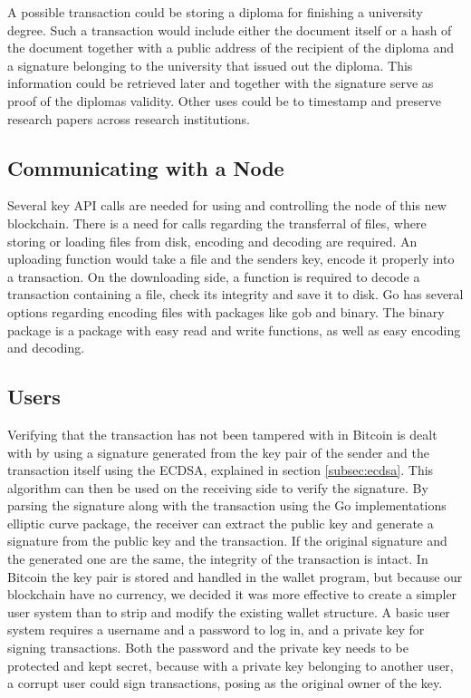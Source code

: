 \documentclass[12pt]{article}
\begin{document}

A possible transaction could be storing a diploma for finishing a university degree. Such a transaction would include either the document itself or a hash of the document together with a public address of the recipient of the diploma and a signature belonging to the university that issued out the diploma. This information could be retrieved later and together with the signature serve as proof of the diplomas validity. Other uses could be to timestamp and preserve research papers across research institutions. 

\subsection{Communicating with a Node}
 
Several key API calls are needed for using and controlling the node of this new blockchain. There is a need for calls regarding the transferral of files, where storing or loading files from disk, encoding and decoding are required. An uploading function would take a file and the senders key, encode it properly into a transaction. On the downloading side, a function is required to decode a transaction containing a file, check its integrity and save it to disk. Go has several options regarding encoding files with  packages like gob and binary. The binary package is a package with easy read and write functions, as well as easy encoding and decoding. %

\subsection{Users}

Verifying that the transaction has not been tampered with in Bitcoin is dealt with by using a signature generated from the key pair of the sender and the transaction itself using the ECDSA, explained in section \ref{subsec:ecdsa}. This algorithm can then be used on the receiving side to verify the signature. By parsing the signature along with the transaction using the Go implementations elliptic curve package, the receiver can extract the public key and generate a signature from the public key and the transaction. If the original signature and the generated one are the same, the integrity of the transaction is intact. In Bitcoin the key pair is stored and handled in the wallet program, but because our blockchain have no currency, we decided it was more effective to create a simpler user system than to strip and modify the existing wallet structure. A basic user system requires a username and a password to log in, and a private key for signing transactions. Both the password and the private key needs to be protected and kept secret, because with a private key belonging to another user, a corrupt user could sign transactions, posing as the original owner of the key. 
\end{document}
